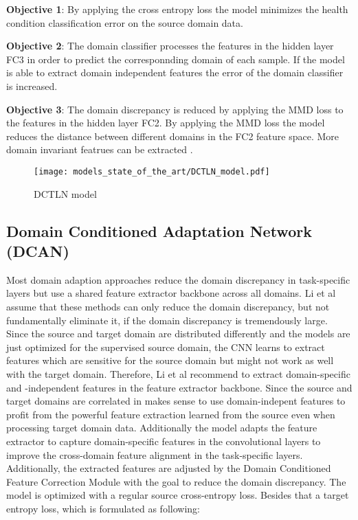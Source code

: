 \textbf{Objective 1}: By applying the cross entropy loss the model minimizes the health condition classification error on the source domain data.

\textbf{Objective 2}: The domain classifier processes the features in the hidden layer FC3 in order to predict the corresponnding domain of each sample. If the model is able to extract domain independent features the error of the domain classifier is increased.

\textbf{Objective 3}: The domain discrepancy is reduced by applying the MMD loss to the features in the hidden layer FC2. By applying the MMD loss the model reduces the distance between different domains in the FC2 feature space. More domain invariant featrues can be extracted \cite{Guo2019}. 

\begin{figure}[p]
  \centering
  \texttt{[image: models\_state\_of\_the\_art/DCTLN\_model.pdf]}
  \caption{DCTLN model \cite{Guo2019}}
  \label{fig:DCTLN_model}
\end{figure}

\subsection{Domain Conditioned Adaptation Network (DCAN)}
Most domain adaption approaches reduce the domain discrepancy in task-specific layers but use a shared feature extractor backbone across all domains. Li et al \cite{li2020} assume that these methods can only reduce the domain discrepancy, but not fundamentally eliminate it, if the domain discrepancy is tremendously large. Since the source and target domain are distributed differently and the models are just optimized for the supervised source domain, the CNN learns to extract features which are sensitive for the source domain but might not work as well with the target domain. Therefore, Li et al recommend to extract domain-specific and -independent features in the feature extractor backbone. 
Since the source and target domains are correlated in makes sense to use domain-indepent features to profit from the powerful feature extraction learned from the source even when processing target domain data. Additionally the model adapts the feature extractor to capture domain-specific features in the convolutional layers to improve the cross-domain feature alignment in the task-specific layers. Additionally, the extracted features are adjusted by the Domain Conditioned Feature Correction Module with the goal to reduce the domain discrepancy. The model is optimized with a regular source cross-entropy loss. Besides that a target entropy loss, which is formulated as following: 

